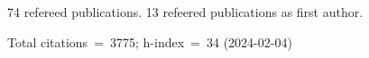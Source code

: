 74 refereed publications. 13 refeered publications as first author.

Total citations~=~3775; h-index~=~34 (2024-02-04)